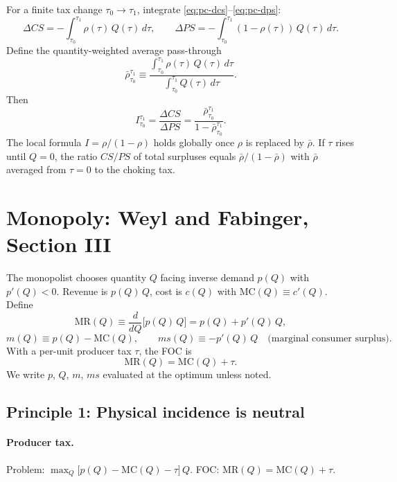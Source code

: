 \documentclass[11pt]{article}
\begin{document}
For a finite tax change $\tau_0 \to \tau_1$, integrate
\eqref{eq:pc-dcs}--\eqref{eq:pc-dps}:
\[
  \Delta CS = -\int_{\tau_0}^{\tau_1} \rho(\tau)\,Q(\tau)\,d\tau,
  \qquad
  \Delta PS = -\int_{\tau_0}^{\tau_1} (1-\rho(\tau))\,Q(\tau)\,d\tau.
\]
Define the quantity-weighted average pass-through
\[
  \bar\rho_{\tau_0}^{\tau_1}
  \equiv
  \frac{\int_{\tau_0}^{\tau_1} \rho(\tau)\,Q(\tau)\,d\tau}
       {\int_{\tau_0}^{\tau_1} Q(\tau)\,d\tau}.
\]
Then
\[
  I_{\tau_0}^{\tau_1}
  = \frac{\Delta CS}{\Delta PS}
  = \frac{\bar\rho_{\tau_0}^{\tau_1}}{1 - \bar\rho_{\tau_0}^{\tau_1}}.
\]
The local formula $I = \rho/(1-\rho)$ holds globally once $\rho$ is replaced
by $\bar\rho$.  If $\tau$ rises until $Q=0$, the ratio $CS/PS$ of total
surpluses equals $\bar\rho/(1-\bar\rho)$ with $\bar\rho$ averaged from
$\tau=0$ to the choking tax.

\section{Monopoly: Weyl and Fabinger, Section III}
\label{sec:monopoly}

The monopolist chooses quantity $Q$ facing inverse demand $p(Q)$ with
$p'(Q) < 0$.  Revenue is $p(Q)\,Q$, cost is $c(Q)$ with
$\mathrm{MC}(Q) \equiv c'(Q)$.  Define
\[
  \mathrm{MR}(Q) \equiv \frac{d}{dQ}\bigl[p(Q)\,Q\bigr] = p(Q) + p'(Q)\,Q,
\]
\[
  m(Q) \equiv p(Q) - \mathrm{MC}(Q),
  \qquad
  ms(Q) \equiv -p'(Q)\,Q \quad \text{(marginal consumer surplus)}.
\]
With a per-unit producer tax $\tau$, the FOC is
\begin{equation}
  \mathrm{MR}(Q) = \mathrm{MC}(Q) + \tau.
  \label{eq:mr-tax}
\end{equation}
We write $p$, $Q$, $m$, $ms$ evaluated at the optimum unless noted.

\subsection{Principle 1: Physical incidence is neutral}

\paragraph{Producer tax.}
Problem: $\max_Q \bigl[p(Q) - \mathrm{MC}(Q) - \tau\bigr]\,Q$.
FOC: $\mathrm{MR}(Q) = \mathrm{MC}(Q) + \tau$.
\end{document}
